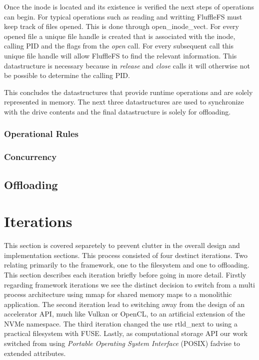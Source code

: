 Once the inode is located and its existence is verified the next steps of
operations can begin. For typical operations such as reading and writting
FluffleFS must keep track of files opened. This is done through
open\_inode\_vect. For every opened file a unique file handle is created that is
associated with the inode, calling PID and the flags from the \textit{open}
call. For every subsequent call this unique file handle will allow FluffleFS to
find the relevant information. This datastructure is necessary because in
\textit{release} and \textit{close} calls it will otherwise not be possible to
determine the calling PID.

This concludes the datastructures that provide runtime operations and are solely
represented in memory. The next three datastructures are used to synchronize
with the drive contents and the final datastructure is solely for offloading.



\subsubsection{Operational Rules}



\subsubsection{Concurrency}

\subsection{Offloading}


\section{Iterations}

This section is covered separetely to prevent clutter in the overall design and
implementation sections. This process consisted of four destinct iterations.
Two relating primarily to the framework, one to the filesystem and one to
offloading. This section describes each iteration briefly before going in more
detail. Firstly regarding framework iterations we see the distinct decision
to switch from a multi process architecture using mmap for shared memory maps to
a monolithic application. The second iteration lead to switching away from the
design of an accelerator API, much like Vulkan \cite{vulkan} or OpenCL, to an
artificial extension of the NVMe namespace. The third iteration changed the use
rtld\_next \cite{rtldnext} to using a practical filesystem with FUSE. Lastly, as
computational storage API our work switched from using
\textit{Portable Operating System Interface} (POSIX) fadvise \cite{fadvise} to
extended attributes.

